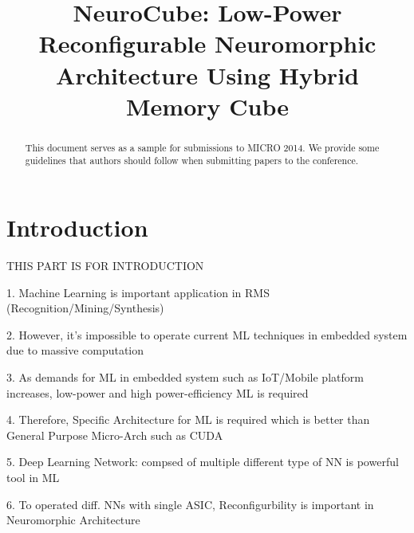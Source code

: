 \documentclass[pageno]{jpaper}
\begin{document}
\title{NeuroCube: Low-Power Reconfigurable Neuromorphic Architecture Using Hybrid Memory Cube}

\date{}
\maketitle

\thispagestyle{empty}

\begin{abstract}
This document serves as a sample for submissions to MICRO 2014.
We provide some guidelines that authors should follow when submitting papers to
the conference.
\end{abstract}

\section{Introduction}

THIS PART IS FOR INTRODUCTION

1. Machine Learning is important application in RMS (Recognition/Mining/Synthesis)

2. However, it's impossible to operate current ML techniques in embedded system due to massive computation

3. As demands for ML in embedded system such as IoT/Mobile platform increases, low-power and high power-efficiency ML is required

4. Therefore, Specific Architecture for ML is required which is better than General Purpose Micro-Arch such as CUDA

5. Deep Learning Network: compsed of multiple different type of NN is powerful tool in ML

6. To operated diff. NNs with single ASIC, Reconfigurbility is important in Neuromorphic Architecture


%
%
\end{document}
